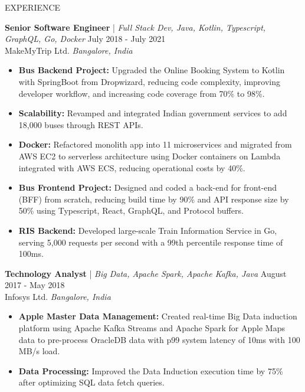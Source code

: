 \documentclass{resume} %
\begin{document}
\begin{rSection}{EXPERIENCE}

\textbf{Senior Software Engineer} | \textit{Full Stack Dev, Java, Kotlin, Typescript, GraphQL, Go, Docker} \hfill July 2018 - July 2021\\
MakeMyTrip Ltd. \hfill \textit{Bangalore, India}
 \begin{itemize}
    \itemsep -3pt {} 
     \item \textbf{Bus Backend Project:} Upgraded the Online Booking System to Kotlin with SpringBoot from Dropwizard, reducing code complexity, improving developer workflow, and increasing code coverage from 70\% to 98\%.
     
     \item \textbf{Scalability:} Revamped and integrated Indian government services to add 18,000 buses through REST APIs.
     
     \item \textbf{Docker:} Refactored monolith app into 11 microservices and migrated from AWS EC2 to serverless architecture using Docker containers on Lambda integrated with AWS ECS, reducing operational costs by 40\%.
     
    \item \textbf{Bus Frontend Project:} Designed and coded a back-end for front-end (BFF) from scratch, reducing build time by 90\% and API response size by 50\% using Typescript, React, GraphQL, and Protocol buffers.
    
    \item \textbf{RIS Backend:} Developed large-scale Train Information Service in Go, serving 5,000 requests per second with a 99th percentile response time of 100ms. 
 \end{itemize}
 
\textbf{Technology Analyst} | \textit{Big Data, Apache Spark, Apache Kafka, Java} \hfill August 2017 - May 2018\\
Infosys Ltd. \hfill \textit{Bangalore, India}
 \begin{itemize}
    \itemsep -3pt {}
    \item \textbf{Apple Master Data Management:} Created real-time Big Data induction platform using Apache Kafka Streams and Apache Spark for Apple Maps data to pre-process OracleDB data with p99 system latency of 10ms with 100 MB/s load. 
    \item \textbf{Data Processing:} Improved the Data Induction execution time by 75\% after optimizing SQL data fetch queries.
 \end{itemize}

\end{rSection} 
\end{document}
